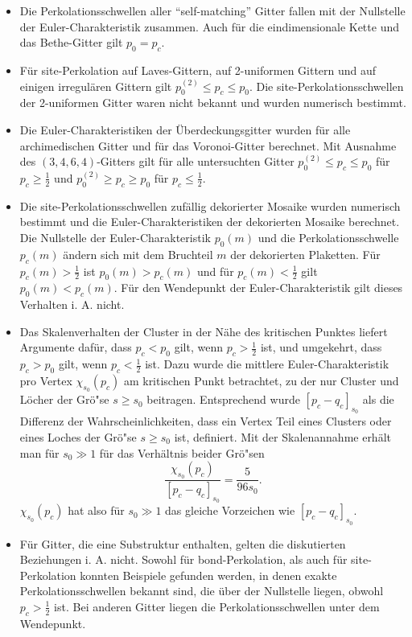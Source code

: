 \begin{itemize}
\item Die Perkolationsschwellen aller ``self-matching'' Gitter fallen mit der Nullstelle der Euler-Charakteristik zusammen. Auch f\"ur die eindimensionale Kette und das Bethe-Gitter gilt $p_0=p_c$.
\item F\"ur site-Perkolation auf Laves-Gittern, auf 2-uniformen Gittern und auf einigen irregul\"aren Gittern gilt $p_0^{(2)}\leq p_c \leq p_0$. Die site-Perkolationsschwellen der 2-uniformen Gitter waren nicht bekannt und wurden numerisch bestimmt. 
\item Die Euler-Charakteristiken der \"Uberdeckungsgitter wurden f\"ur alle archimedischen Gitter und f\"ur das Voronoi-Gitter berechnet. Mit Ausnahme des $(3,4,6,4)$-Gitters gilt f\"ur alle untersuchten Gitter $p_0^{(2)}\leq p_c \leq p_0$ f\"ur $p_c\geq \frac{1}{2}$ und $p_0^{(2)}\geq p_c \geq p_0$ f\"ur $p_c\leq \frac{1}{2}$.
\item Die site-Perkolationsschwellen zuf\"allig dekorierter Mosaike wurden numerisch bestimmt und die Euler-Charakteristiken der dekorierten Mosaike berechnet. Die Nullstelle der Euler-Charakteristik $p_0(m)$ und die Perkolationsschwelle $p_c(m)$ \"andern sich mit dem Bruchteil $m$ der dekorierten Plaketten. F\"ur $p_c(m)>\frac{1}{2}$ ist $p_0(m)>p_c(m)$ und f\"ur $p_c(m)<\frac{1}{2}$ gilt $p_0(m)<p_c(m)$. F\"ur den Wendepunkt der Euler-Charakteristik gilt dieses Verhalten i. A. nicht.
\item Das Skalenverhalten der Cluster in der N\"ahe des kritischen Punktes liefert Argumente daf\"ur, dass $p_c<p_0$ gilt, wenn $p_c>\frac{1}{2}$ ist, und umgekehrt, dass $p_c>p_0$ gilt, wenn $p_c<\frac{1}{2}$ ist. Dazu wurde die mittlere Euler-Charakteristik pro Vertex $\chi_{s_0}(p_c)$ am kritischen Punkt betrachtet, zu der nur Cluster und L\"ocher der Gr\"o"se $s\geq s_0$ beitragen. Entsprechend wurde $[p_c-q_c]_{s_0}$ als die Differenz der Wahrscheinlichkeiten, dass ein Vertex Teil eines Clusters oder eines Loches der Gr\"o"se $s\geq s_0$ ist, definiert. Mit der Skalenannahme erh\"alt man f\"ur $s_0\gg 1$ f\"ur das Verh\"altnis beider Gr\"o"sen
\begin{equation}
  \frac{\chi_{s_0}(p_c)}{[p_c-q_c]_{s_0}}=\frac{5}{96s_0}.
\end{equation}
$\chi_{s_0}(p_c)$ hat also f\"ur $s_0\gg 1$ das gleiche Vorzeichen wie $[p_c-q_c]_{s_0}$.
\item F\"ur Gitter, die eine Substruktur enthalten, gelten die diskutierten Beziehungen i. A. nicht. Sowohl f\"ur bond-Perkolation, als auch f\"ur site-Perkolation konnten Beispiele gefunden werden, in denen exakte Perkolationsschwellen bekannt sind, die \"uber der Nullstelle liegen, obwohl $p_c>\frac{1}{2}$ ist. Bei anderen Gitter liegen die Perkolationsschwellen unter dem Wendepunkt. 
\end{itemize}
